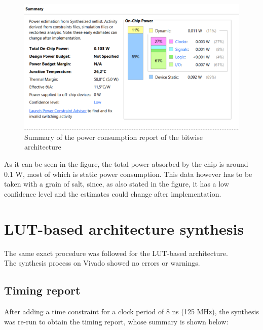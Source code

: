\begin{figure}[H]
    \begin{center}
        \includegraphics[scale=.85,clip]{img/vivado_bit_power.png}
    \end{center}
    \vspace*{-0.5cm}
    \caption{Summary of the power consumption report of the bitwise architecture}
    \label{fig:vivado_bit_power}
\end{figure}
\hfill \break
As it can be seen in the figure, the total power absorbed by the chip is around 0.1 W, most of which is static power consumption. This data however has to be taken with a grain of salt, since, as also stated in the figure, it has a low confidence level and the estimates could change after implementation.

\section{LUT-based architecture synthesis}
The same exact procedure was followed for the LUT-based architecture.\\
\hfill \break
The synthesis process on Vivado showed no errors or warnings.\\

\subsection{Timing report}
After adding a time constraint for a clock period of 8 ns (125 MHz), the synthesis was re-run to obtain the timing report, whose summary is shown below:

